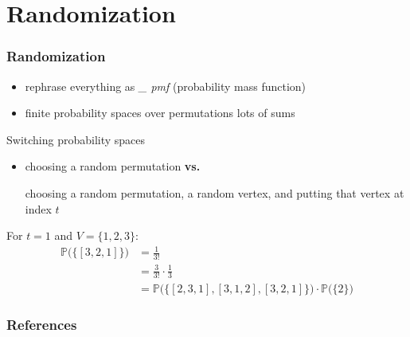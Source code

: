 \documentclass{beamer}
\begin{document}
\section{Randomization}
\begin{frame}
  \frametitle{Randomization}
  \begin{itemize}[<+->]
    \item rephrase everything as \emph{\_ pmf} (probability mass function)
    \item finite probability spaces over permutations \textrightarrow{} lots of sums
  \end{itemize}
  \onslide<+->
  \begin{alertblock}{Switching probability spaces}
    \begin{itemize}[<+->]
      \item choosing a random permutation \textbf{vs.}
      
      choosing a random permutation, a random vertex, and putting that vertex at index $t$
    \end{itemize}
    \onslide<+->
    For $t = 1$ and $V = \{1,2,3\}$:
    \begin{align*}
      \mathbb{P}\Big(\big\{[3,2,1]\big\}\Big) &= \frac{1}{3!} \\
        &= \frac{3}{3!} \cdot \frac{1}{3} \\
        &= \mathbb{P}\Big(\big\{[2,3,1], [3,1,2], [3,2,1]\big\}\Big) \cdot \mathbb{P}\big(\{2\}\big)
    \end{align*}
  \end{alertblock}
\end{frame}

\begin{frame}
  \frametitle{References}
  
  
\end{frame}
\end{document}
